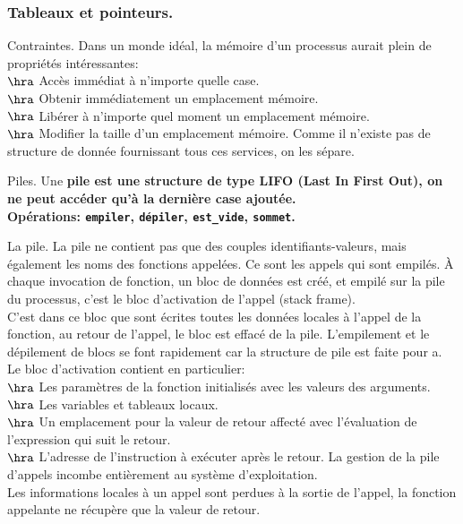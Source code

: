 \documentclass[french, 11pt]{article}
\begin{document}
\subsubsection{Tableaux et pointeurs.}

\begin{defi}{Contraintes.}{}
    Dans un monde idéal, la mémoire d'un processus aurait plein de propriétés intéressantes:\\
    $\hra$ Accès immédiat à n'importe quelle case.\\
    $\hra$ Obtenir immédiatement un emplacement mémoire.\\
    $\hra$ Libérer à n'importe quel moment un emplacement mémoire.\\
    $\hra$ Modifier la taille d'un emplacement mémoire.\n
    Comme il n'existe pas de structure de donnée fournissant tous ces services, on les sépare.
\end{defi}

\begin{defi}{Piles.}{}
    Une \bf{pile} est une structure de type LIFO (Last In First Out), on ne peut accéder qu'à la dernière case ajoutée.\\
    \bf{Opérations:} \texttt{empiler}, \texttt{dépiler}, \texttt{est\_vide}, \texttt{sommet}.
\end{defi}

\pagebreak

\begin{defi}{La pile.}{}
    La pile ne contient pas que des couples identifiants-valeurs, mais également les noms des fonctions appelées. Ce sont les appels qui sont empilés.\n
    À chaque invocation de fonction, un bloc de données est créé, et empilé sur la pile du processus, c'est le bloc d'activation de l'appel (stack frame).\\
    C'est dans ce bloc que sont écrites toutes les données locales à l'appel de la fonction, au retour de l'appel, le bloc est effacé de la pile. L'empilement et le dépilement de blocs se font rapidement car la structure de pile est faite pour a.\n
    Le bloc d'activation contient en particulier:\\
    $\hra$ Les paramètres de la fonction initialisés avec les valeurs des arguments.\\
    $\hra$ Les variables et tableaux locaux.\\
    $\hra$ Un emplacement pour la valeur de retour affecté avec l'évaluation de l'expression qui suit le retour.\\
    $\hra$ L'adresse de l'instruction à exécuter après le retour.\n
    La gestion de la pile d'appels incombe entièrement au système d'exploitation.\\
    Les informations locales à un appel sont perdues à la sortie de l'appel, la fonction appelante ne récupère que la valeur de retour.
\end{defi}
\end{document}
